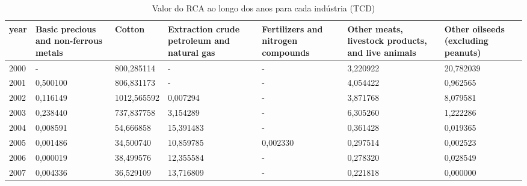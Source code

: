 \begin{table}
\centering
\caption{Valor do RCA ao longo dos anos para cada indústria (TCD)}
\begin{tabular}{p{1cm}p{2cm}p{2cm}p{2cm}p{2cm}p{2cm}p{2cm}}
\toprule
 year &  Basic precious and non-ferrous metals &      Cotton &  Extraction crude petroleum and natural gas &  Fertilizers and nitrogen compounds &  Other meats, livestock products, and live animals &  Other oilseeds (excluding peanuts) \\
\midrule
 2000 &                                      - &  800,285114 &                                           - &                                   - &                                           3,220922 &                           20,782039 \\
 2001 &                               0,500100 &  806,831173 &                                           - &                                   - &                                           4,054422 &                            0,962565 \\
 2002 &                               0,116149 & 1012,565592 &                                    0,007294 &                                   - &                                           3,871768 &                            8,079581 \\
 2003 &                               0,238440 &  737,837758 &                                    3,154289 &                                   - &                                           6,305260 &                            1,222286 \\
 2004 &                               0,008591 &   54,666858 &                                   15,391483 &                                   - &                                           0,361428 &                            0,019365 \\
 2005 &                               0,001486 &   34,500740 &                                   10,859785 &                            0,002330 &                                           0,297514 &                            0,002523 \\
 2006 &                               0,000019 &   38,499576 &                                   12,355584 &                                   - &                                           0,278320 &                            0,028549 \\
 2007 &                               0,004336 &   36,529109 &                                   13,716809 &                                   - &                                           0,221818 &                            0,000000 \\

\end{tabular}
\end{table}
